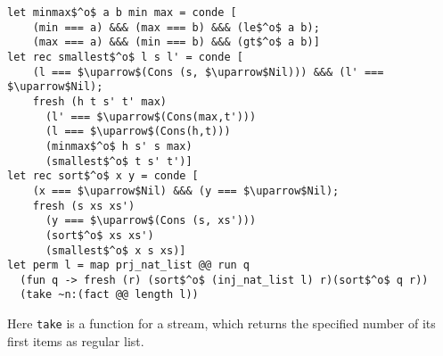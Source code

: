 \documentclass[10pt, oneside, nocopyrightspace]{sigplanconf}
\begin{document}
\begin{lstlisting}[mathescape=true]
let minmax$^o$ a b min max = conde [
    (min === a) &&& (max === b) &&& (le$^o$ a b);
    (max === a) &&& (min === b) &&& (gt$^o$ a b)]
let rec smallest$^o$ l s l' = conde [       
    (l === $\uparrow$(Cons (s, $\uparrow$Nil))) &&& (l' === $\uparrow$Nil);
    fresh (h t s' t' max)
      (l' === $\uparrow$(Cons(max,t')))
      (l === $\uparrow$(Cons(h,t)))
      (minmax$^o$ h s' s max)
      (smallest$^o$ t s' t')] 
let rec sort$^o$ x y = conde [
    (x === $\uparrow$Nil) &&& (y === $\uparrow$Nil);
    fresh (s xs xs')
      (y === $\uparrow$(Cons (s, xs')))
      (sort$^o$ xs xs')       
      (smallest$^o$ x s xs)]
let perm l = map prj_nat_list @@ run q 
  (fun q -> fresh (r) (sort$^o$ (inj_nat_list l) r)(sort$^o$ q r))
  (take ~n:(fact @@ length l))
\end{lstlisting}

\begin{comment}
\begin{lstlisting}[mathescape=true]
   let perm l = map prj_int_list @@ 
     run q 
       (fun q -> sort$^o$ q (inj_int_list (sort compare l))) 
       (take ~n:(fact @@ length l))
\end{lstlisting}
\end{comment}

Here \lstinline{take} is a function for a stream, which returns the specified 
number of its first items as regular list.

\begin{comment}
\section{Conclusion}

We presented strongly typed implementation of miniKanren for OCaml. Our implementation
passes all tests, written for miniKanren (including those for disequality constraints);
in addition we implemented many of interesting relational programs, known from
the literature. We claim, that our implementation can be used both as a convenient
relational DSL for OCaml and an experimental framework for future research in the area of
relational programming. 

The source code of our implementation is accessible from \url{https://github.com/dboulytchev/OCanren}.

We also want to express our gratitude to William Byrd, who infected us with relational programming, for 
the time he sacrificed to very instructive and clarifying conversations.
\end{comment}
\end{document}
